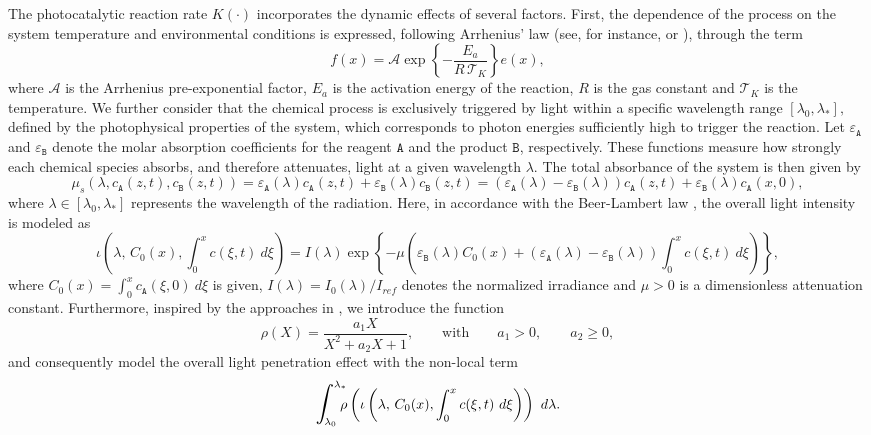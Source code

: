 \documentclass[a4paper, UKenglish, numberwithinsect, thm-restate]{tgdk-v2021}
\begin{document}
The photocatalytic reaction rate $K(\cdot)$ incorporates the dynamic effects of several factors. First, the dependence of the process on the system temperature and environmental conditions is expressed, following Arrhenius' law (see, for instance, \cite[Section 10.9]{Atkins-DePaula} or \cite[Page 174]{Laidler}), through the term
\begin{equation*}\label{eq:Arrhenius}
f(x) = \mathcal{A} \exp\left\{-\frac{E_a}{R \, \mathcal{T}_K}\right\} e(x),
\end{equation*}
where $\mathcal{A}$ is the Arrhenius pre-exponential factor, $E_a$ is the activation energy of the reaction, $R$ is the gas constant and $\mathcal{T}_K$ is the temperature. We further consider that the chemical process is exclusively triggered by light within a specific wavelength range $[\lambda_{0},\lambda_{*}],$ defined by the photophysical properties of the system, which corresponds to photon energies sufficiently high to trigger the reaction. Let $\varepsilon_\texttt{A}$ and $\varepsilon_\texttt{B}$ denote the molar absorption coefficients for the reagent $\texttt{A}$ and the product $\texttt{B}$, respectively. These functions measure how strongly each chemical species absorbs, and therefore attenuates, light at a given wavelength $\lambda.$ The total absorbance of the system is then given by
\begin{equation*}
     \mu_s(\lambda,c_\texttt{A}(z,t),c_\texttt{B}(z,t))=\varepsilon_\texttt{A}(\lambda)c_\texttt{A}(z,t)+\varepsilon_\texttt{B}(\lambda)c_\texttt{B}(z,t)=(\varepsilon_\texttt{A}(\lambda)-\varepsilon_\texttt{B}(\lambda))c_\texttt{A}(z,t)+\varepsilon_\texttt{B}(\lambda)c_\texttt{A}(x,0),
\end{equation*}
where $\lambda\in[\lambda_{0},\lambda_{*}]$ represents the wavelength of the radiation. Here, in accordance with the Beer-Lambert law \cite{d2012simplified}, the overall light intensity is modeled as  
\begin{equation*}
    \iota  \left(  \lambda,\, C_0(x),  \int_0^x   c(\xi,t) \ d\xi  \right)  =  I(\lambda) \exp  \left\{  -  \mu  \left(  \varepsilon_\texttt{B}(\lambda) C_0(x) +  (\varepsilon_\texttt{A}(\lambda) -\varepsilon_\texttt{B}(\lambda))  \int_0^x    c(\xi,t)  \ d\xi  \right)  \right\},
\end{equation*}
where $C_0(x) = \int_0^x  c_\texttt{A}(\xi,0) \ d\xi$ is given, $I(\lambda) = I_0(\lambda)/I_{ref}$ denotes the normalized irradiance and $\mu > 0$ is a dimensionless attenuation constant. Furthermore, inspired by the approaches in \cite{Ceseri_Natalini_Pezzella,Clarelli2013,EILERS,THEBAULT}, we introduce the function  
\begin{equation}\label{eq: rho}
    \rho(X) = \dfrac{a_1 X}{X^2 + a_2 X + 1}, \qquad \text{with} \qquad a_1>0, \qquad  a_2 \geq 0, 
\end{equation}
and consequently model the overall light penetration effect with the non-local term  
\begin{equation*}
    \scalebox{1.3}{$\displaystyle\int$}_{\!\!\!\!\! \lambda_{0}}^{\lambda_{*}} \!\!\! \rho\left(\iota\left(\lambda,\, C_0(x), \int_0^x    c(\xi,t)  \ d\xi\right)\right) \ d\lambda.
\end{equation*}
\end{document}
